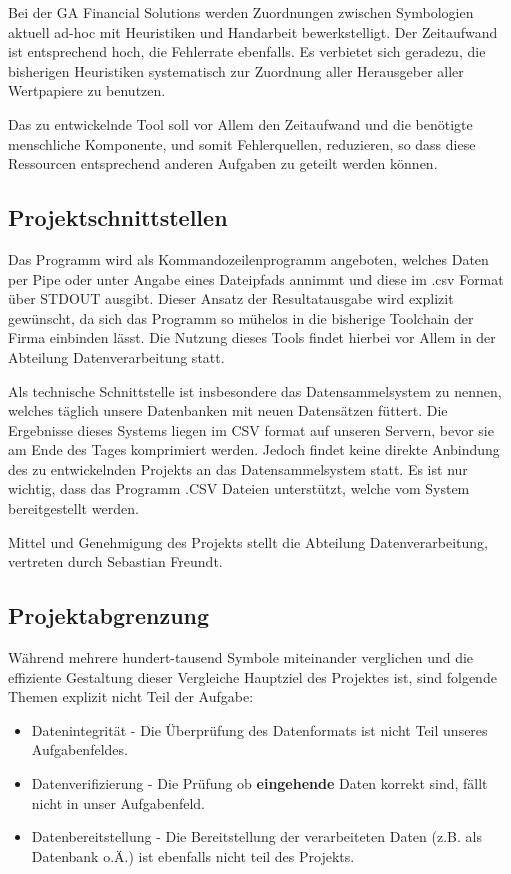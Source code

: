 Bei der GA Financial Solutions werden Zuordnungen zwischen Symbologien
aktuell ad-hoc mit Heuristiken und Handarbeit bewerkstelligt.  Der
Zeitaufwand ist entsprechend hoch, die Fehlerrate ebenfalls.  Es
verbietet sich geradezu, die bisherigen Heuristiken systematisch zur
Zuordnung aller Herausgeber aller Wertpapiere zu benutzen.\par

Das zu entwickelnde Tool soll vor Allem den Zeitaufwand und die benötigte
menschliche Komponente, und somit Fehlerquellen, reduzieren, so dass diese Ressourcen entsprechend
anderen Aufgaben zu geteilt werden können.\par

\subsection{Projektschnittstellen}
Das Programm wird als Kommandozeilenprogramm angeboten, welches
Daten per Pipe oder unter Angabe eines Dateipfads annimmt und diese im .csv 
Format über STDOUT ausgibt. Dieser Ansatz der Resultatausgabe wird explizit gewünscht, 
da sich das Programm so mühelos in die bisherige Toolchain der Firma einbinden lässt.
Die Nutzung dieses Tools findet hierbei vor Allem in der Abteilung
Datenverarbeitung statt.\par

Als technische Schnittstelle ist insbesondere das Datensammelsystem zu nennen,
welches täglich unsere Datenbanken mit neuen Datensätzen füttert. Die Ergebnisse
dieses Systems liegen im CSV format auf unseren Servern, bevor sie am Ende des
Tages komprimiert werden. Jedoch findet keine direkte Anbindung des zu entwickelnden 
Projekts an das Datensammelsystem statt. Es ist nur wichtig, dass das Programm 
.CSV Dateien unterstützt, welche vom System bereitgestellt werden.\par

Mittel und Genehmigung des Projekts stellt die Abteilung Datenverarbeitung,
vertreten durch Sebastian Freundt.\par

\subsection{Projektabgrenzung}
Während mehrere hundert-tausend Symbole miteinander verglichen und die
effiziente Gestaltung dieser Vergleiche Hauptziel des Projektes ist, sind folgende
Themen explizit nicht Teil der Aufgabe:

\begin{itemize}
    \item Datenintegrität - Die Überprüfung des Datenformats ist nicht Teil unseres Aufgabenfeldes.
    \item Datenverifizierung - Die Prüfung ob \textbf{eingehende} Daten korrekt sind, fällt nicht in unser Aufgabenfeld.
    \item Datenbereitstellung - Die Bereitstellung der verarbeiteten Daten (z.B. als Datenbank o.Ä.) ist ebenfalls nicht teil des Projekts.
\end{itemize}
\clearpage

